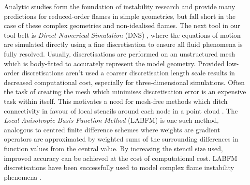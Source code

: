 Analytic studies form the foundation of instability research and provide many predictions for reduced-order flames in simple geometries, but fall short in the case of these complex geometries and non-idealised flames. The next tool in our tool belt is \emph{Direct Numerical Simulation} (DNS) \cite{orszag1970AnalyticalTheoriesTurbulence}, where the equations of motion are simulated directly using a fine discretisation to ensure all fluid phenomena is fully resolved. Usually, discretisations are performed on an unstructured mesh which is body-fitted to accurately represent the model geometry. Provided low-order discretisations aren't used a coarser discretisation length scale results in decreased computational cost, especially for three-dimensional simulations. Often the task of creating the mesh which minimises discretisation error is an expensive task within itself. This motivates a need for mesh-free methods which ditch connectivity in favour of local stencils around each node in a point cloud \cite{garg2018MeshfreeMethodsComprehensive, li2002MeshfreeParticleMethods}. The \emph{Local Anisotropic Basis Function Method} (LABFM) \cite{king2020HighOrderDifference, king2022HighOrderSimulationsIsothermal} is one such method, analogous to centred finite difference schemes where weights are gradient operators are approximated by weighted sums of the surrounding differences in function values from the central value. By increasing the stencil size used, improved accuracy can be achieved at the cost of computational cost. LABFM discretisations have been successfully used to model complex flame instability phenomena \cite{king2024MeshFreeFrameworkHighOrdera, broadley2025HighorderMeshfreeDirect}.

